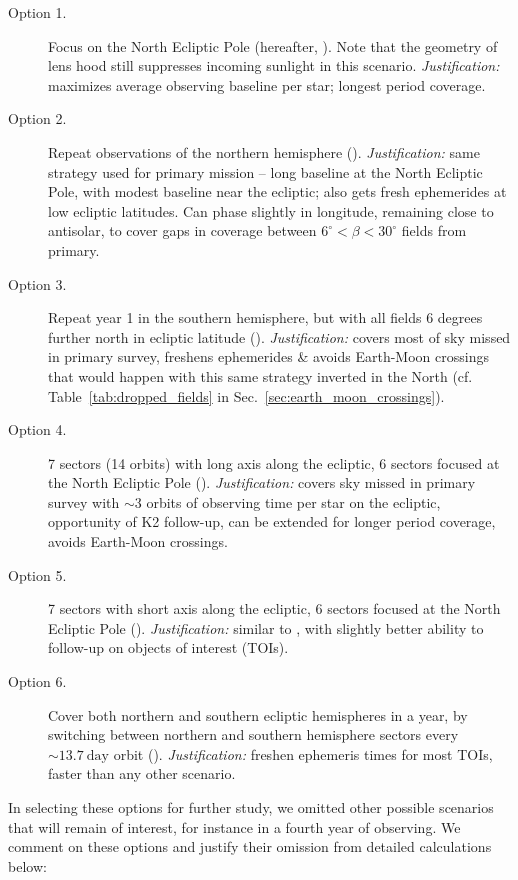 \begin{description}
	\item[Option 1.] Focus on the North Ecliptic Pole (hereafter, \npole). Note that the geometry of \tesss lens hood still suppresses incoming sunlight in this scenario. 
	\textit{Justification:} maximizes average observing baseline per star; longest period coverage.
	\item[Option 2.] Repeat observations of the northern hemisphere (\nhemi).
	\textit{Justification:} same strategy used for primary mission -- long baseline at the North Ecliptic Pole, with modest baseline near the ecliptic; also gets fresh ephemerides at low ecliptic latitudes. Can phase slightly in longitude, remaining close to antisolar, to cover gaps in coverage between $6^\circ < \beta < 30^\circ$ fields from primary.
	\item[Option 3.] Repeat year 1 in the southern hemisphere, but with all fields 6 degrees further north in ecliptic latitude (\shemiAvoid).
	\textit{Justification:} covers most of sky missed in primary survey, freshens ephemerides \& avoids Earth-Moon crossings that would happen with this same strategy inverted in the North (cf. Table~\ref{tab:dropped_fields} in Sec.~\ref{sec:earth_moon_crossings}).
	\item[Option 4.] 7 sectors (14 orbits) with \tesss long axis along the ecliptic, 6 sectors focused at the North Ecliptic Pole (\elong).
	\textit{Justification:} covers sky missed in primary survey with $\sim3$ orbits of observing time per star on the ecliptic, opportunity of K2 follow-up, can be extended for longer period coverage, avoids Earth-Moon crossings.
	\item[Option 5.] 7 sectors with \tesss short axis along the ecliptic, 6 sectors focused at the North Ecliptic Pole (\eshort). 
	\textit{Justification:} similar to \elong, with slightly better ability to follow-up on \tess objects of interest (TOIs).
	\item[Option 6.] Cover both northern and southern ecliptic hemispheres in a year, by switching between northern and southern hemisphere sectors every $\sim13.7\ \text{day}$ orbit (\hemis).
	\textit{Justification:} freshen ephemeris times for most TOIs, faster than any other scenario.
\end{description}

In selecting these options for further study, we omitted other possible scenarios that will remain of interest, for instance in a fourth year of observing. We comment on these options and justify their omission from detailed calculations below:


